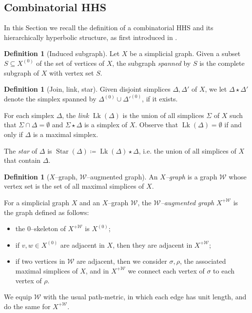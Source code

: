 \documentclass[svgnames]{amsart}
\theoremstyle{plain}
\theoremstyle{definition}
\newtheorem{defn}[thm]{Definition}
\newcommand{\link}{\operatorname{Lk}}
\newcommand{\duaug}[2]{{#1}^{+{#2}}}
\newcommand{\W}{\mathcal{W}}
\begin{document}
\subsection{Combinatorial HHS}\label{sec:what_is_CHHS} 
In this Section we recall the definition of a combinatorial HHS and its hierarchically hyperbolic structure, as first introduced in \cite{BHMS}. 

\begin{defn}[Induced subgraph]
    Let $X$ be a simplicial graph. Given a subset $S\subseteq X^{(0)}$ of the set of vertices of $X$, the subgraph \emph{spanned} by $S$ is the complete subgraph of $X$ with vertex set $S$.
\end{defn}

\begin{defn}[Join, link, star]\label{defn:join_link_star}
Given disjoint simplices $\Delta,\Delta'$ of $X$, we let $\Delta\star\Delta'$ denote the simplex spanned by $\Delta^{(0)}\cup\Delta'^{(0)}$, if it exists. 

For each simplex $\Delta$, the \emph{link} $\link(\Delta)$ is the union of 
all simplices $\Sigma$ of $X$ such that $\Sigma\cap\Delta=\emptyset$ and $\Sigma\star\Delta$ is a simplex of $X$.  Observe that $\link(\Delta)=\emptyset$ if and only if $\Delta$ is a maximal simplex. 

The \emph{star} of $\Delta$ is $\operatorname{Star}(\Delta)\coloneq \link(\Delta)\star\Delta$, i.e. the union of all simplices of $X$ that contain $\Delta$.
\end{defn}

\begin{defn}[$X$--graph, $\W$--augmented graph]\label{defn:X_graph}
An \emph{$X$--graph} is a graph $\W$ whose vertex set is the set of all maximal simplices of $X$.

For a simplicial graph $X$ and an $X$--graph $\W$, the \emph{$\W$--augmented graph} $\duaug{X}{\W}$ is the graph defined as follows:
\begin{itemize}
     \item the $0$--skeleton of $\duaug{X}{\W}$ is $X^{(0)}$;
     \item if $v,w\in X^{(0)}$ are adjacent in $X$, then they are adjacent in $\duaug{X}{\W}$; 	
     \item if two vertices in $\W$ are adjacent, then we consider $\sigma,\rho$, the associated maximal simplices of $X$, and in $\duaug{X}{\W}$ we connect each vertex of $\sigma$ to each vertex of $\rho$.
\end{itemize}
We equip $\W$ with the usual path-metric, in which each edge has unit length, and do the same for $\duaug{X}{\W}$.
\end{defn}
\end{document}
